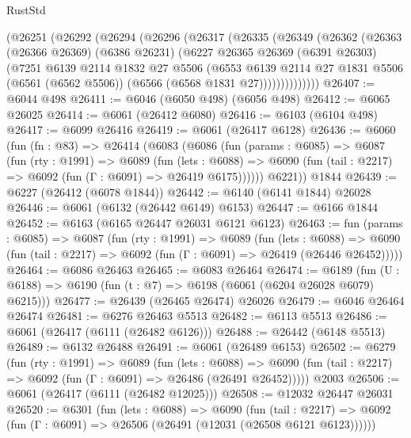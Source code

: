 \begin{lexlean}{RustStd}
\begin{coremodule}
    (@26251
      (@26292
        (@26294
          (@26296
            (@26317
              (@26335
                (@26349
                  (@26362
                    (@26363
                      (@26366 @26369)
                      (@6386 @26231)
                      (@6227
                        @26365
                        @26369
                        (@6391 @26303)
                        (@7251
                          @6139
                          @2114
                          @1832
                          @27
                          @5506
                          (@6553
                            @6139
                            @2114
                            @27
                            @1831
                            @5506
                            (@6561 (@6562 @5506))
                            (@6566 (@6568 @1831 @27))))))))))))))
@26407 := @6044 @498
@26411 := @6046 (@6050 @498) (@6056 @498)
@26412 := @6065 @26025
@26414 := @6061 (@26412 @6080)
@26416 := @6103 (@6104 @498)
@26417 := @6099 @26416
@26419 := @6061 (@26417 @6128)
@26436 := @6060
    (fun (fn : @83) =>
    @26414
      (@6083
        (@6086
          (fun (params : @6085) =>
          @6087
            (fun (rty : @1991) =>
            @6089
              (fun (lets : @6088) =>
              @6090 (fun (tail : @2217) => @6092 (fun (Γ : @6091) => @26419 @6175))))))
        @6221))
    @1844
@26439 := @6227 (@26412 (@6078 @1844))
@26442 := @6140 (@6141 @1844) @26028
@26446 := @6061 (@6132 (@26442 @6149) @6153)
@26447 := @6166 @1844
@26452 := @6163 (@6165 @26447 @26031 @6121 @6123)
@26463 := fun (params : @6085) =>
  @6087
    (fun (rty : @1991) =>
    @6089
      (fun (lets : @6088) =>
      @6090 (fun (tail : @2217) => @6092 (fun (Γ : @6091) => @26419 (@26446 @26452)))))
@26464 := @6086 @26463
@26465 := @6083 @26464
@26474 := @6189
    (fun (U : @6188) => @6190 (fun (t : @7) => @6198 (@6061 (@6204 @26028 @6079) @6215)))
@26477 := @26439 (@26465 @26474) @26026
@26479 := @6046 @26464 @26474
@26481 := @6276 @26463 @5513
@26482 := @6113 @5513
@26486 := @6061 (@26417 (@6111 (@26482 @6126)))
@26488 := @26442 (@6148 @5513)
@26489 := @6132 @26488
@26491 := @6061 (@26489 @6153)
@26502 := @6279
    (fun (rty : @1991) =>
    @6089
      (fun (lets : @6088) =>
      @6090 (fun (tail : @2217) => @6092 (fun (Γ : @6091) => @26486 (@26491 @26452)))))
    @2003
@26506 := @6061 (@26417 (@6111 (@26482 @12025)))
@26508 := @12032 @26447 @26031
@26520 := @6301
    (fun (lets : @6088) =>
    @6090
      (fun (tail : @2217) =>
      @6092 (fun (Γ : @6091) => @26506 (@26491 (@12031 (@26508 @6121 @6123))))))

\end{coremodule}
\end{lexlean}
